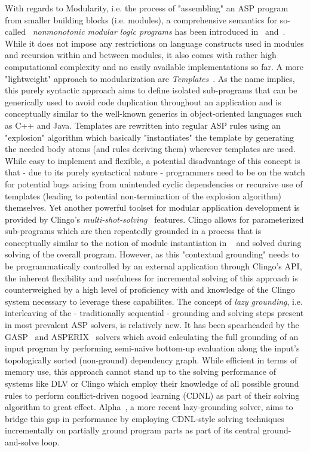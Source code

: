 \documentclass[12pt, letterpaper, twoside]{scrartcl}
\begin{document}
With regards to Modularity, i.e. the process of "assembling" an ASP program from smaller building blocks (i.e. modules), a comprehensive semantics for so-called ~\emph{nonmonotonic modular logic programs} has been introduced in~\cite{mlp-krennw} and~\cite{mlp-2009}. While it does not impose any restrictions on language constructs used in modules and recursion within and between modules, it also comes with rather high computational complexity and no easily available implementations so far. A more "lightweight" approach to modularization are \emph{Templates}~\cite{templates}. As the name implies, this purely syntactic approach aims to define isolated sub-programs that can be generically used to avoid code duplication throughout an application and is conceptually similar to the well-known generics in object-oriented languages such as C++ and Java. Templates are rewritten into regular ASP rules using an "explosion" algorithm which basically "instantiates" the template by generating the needed body atoms (and rules deriving them) wherever templates are used. While easy to implement and flexible, a potential disadvantage of this concept is that - due to its purely syntactical nature - programmers need to be on the watch for potential bugs arising from unintended cyclic dependencies or recursive use of templates (leading to potential non-termination of the explosion algorithm) themselves.
Yet another powerful toolset for modular application development is provided by Clingo's \emph{multi-shot-solving}~\cite{clingo-multishot} features. Clingo allows for parameterized sub-programs which are then repeatedly grounded in a process that is conceptually similar to the notion of module instantiation in ~\cite{modules-compositionality} and solved during solving of the overall program. However, as this "contextual grounding" needs to be programmatically controlled by an external application through Clingo's API, the inherent flexibility and usefulness for incremental solving of this approach is counterweighed by a high level of proficiency with and knowledge of the Clingo system necessary to leverage these capabilites.
The concept of \emph{lazy grounding}, i.e. interleaving of the - traditionally sequential - grounding and solving steps present in most prevalent ASP solvers, is relatively new. It has been spearheaded by the GASP~\cite{gasp-compseq} and ASPERIX~\cite{asperix} solvers which avoid calculating the full grounding of an input program by performing semi-naive bottom-up evaluation along the input's topologically sorted (non-ground) dependency graph. While efficient in terms of memory use, this approach cannot stand up to the solving performance of systems like DLV or Clingo which employ their knowledge of all possible ground rules to perform conflict-driven nogood learning (CDNL) as part of their solving algorithm to great effect. Alpha~\cite{alpha}, a more recent lazy-grounding solver, aims to bridge this gap in performance by employing CDNL-style solving techniques~\cite{alpha-cdnl} incrementally on partially ground program parts as part of its central ground-and-solve loop.
\end{document}
